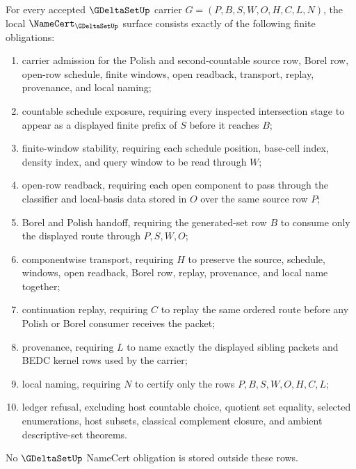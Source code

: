 \begin{theorem}
\label{thm:g-delta-set-namecert-obligations}
For every accepted $\GDeltaSetUp$ carrier $G=(P,B,S,W,O,H,C,L,N)$, the local $\NameCert_{\GDeltaSetUp}$ surface consists exactly of the following finite obligations:
\begin{enumerate}
\item carrier admission for the Polish and second-countable source row, Borel row, open-row schedule, finite windows, open readback, transport, replay, provenance, and local naming;
\item countable schedule exposure, requiring every inspected intersection stage to appear as a displayed finite prefix of $S$ before it reaches $B$;
\item finite-window stability, requiring each schedule position, base-cell index, density index, and query window to be read through $W$;
\item open-row readback, requiring each open component to pass through the classifier and local-basis data stored in $O$ over the same source row $P$;
\item Borel and Polish handoff, requiring the generated-set row $B$ to consume only the displayed route through $P,S,W,O$;
\item componentwise transport, requiring $H$ to preserve the source, schedule, windows, open readback, Borel row, replay, provenance, and local name together;
\item continuation replay, requiring $C$ to replay the same ordered route before any Polish or Borel consumer receives the packet;
\item provenance, requiring $L$ to name exactly the displayed sibling packets and BEDC kernel rows used by the carrier;
\item local naming, requiring $N$ to certify only the rows $P,B,S,W,O,H,C,L$;
\item ledger refusal, excluding host countable choice, quotient set equality, selected enumerations, host subsets, classical complement closure, and ambient descriptive-set theorems.
\end{enumerate}
No $\GDeltaSetUp$ NameCert obligation is stored outside these rows.
\end{theorem}
